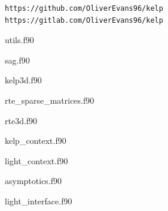 \documentclass[ms,cpyr,lof,lot]{uathesis}
\begin{document}
\begin{verbatim}
https://github.com/OliverEvans96/kelp
https://gitlab.com/OliverEvans96/kelp
\end{verbatim}

utils.f90


sag.f90


kelp3d.f90


rte\_sparse\_matrices.f90


rte3d.f90


kelp\_context.f90


light\_context.f90


asymptotics.f90


light\_interface.f90

\end{document}
